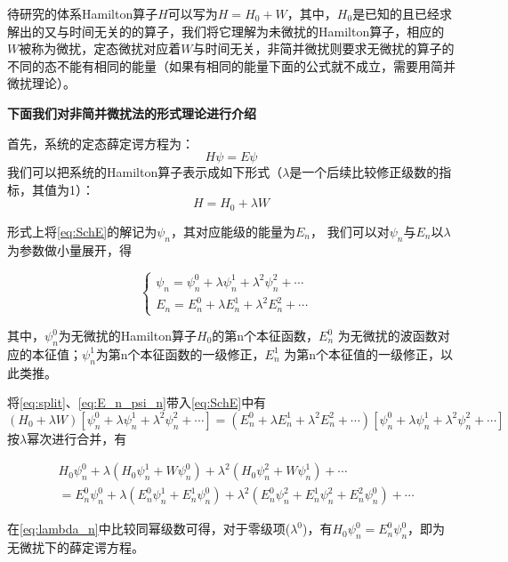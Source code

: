 待研究的体系Hamilton算子$H$可以写为$H=H_0+W$，其中，$H_0$是已知的且已经求解出的又与时间无关的的算子，我们将它理解为未微扰的Hamilton算子，相应的$W$被称为微扰，定态微扰对应着$W$与时间无关，非简并微扰则要求无微扰的算子的不同的态不能有相同的能量（如果有相同的能量下面的公式就不成立，需要用简并微扰理论）。

\textbf{下面我们对非简并微扰法的形式理论进行介绍}

首先，系统的定态薛定谔方程为：
\begin{equation}
	H\psi = E\psi
	\label{eq:SchE}
\end{equation}
我们可以把系统的Hamilton算子表示成如下形式（$\lambda$是一个后续比较修正级数的指标，其值为1）：
\begin{equation}
	H = H_0 +\lambda W
	\label{eq:split}
\end{equation}

形式上将\cref{eq:SchE}的解记为$\psi_n$，其对应能级的能量为$E_n$，
我们可以对$\psi_n$与$E_n$以$\lambda$为参数做小量展开，得

\begin{equation}
	\left\{\begin{matrix}
		\psi_n = \psi_n^0 +\lambda \psi_n^1 +\lambda^2 \psi_n^2 +\cdots & \\
		E_n = E_n^0 +\lambda E_n^1 +\lambda^2 E_n^2 +\cdots  
	\end{matrix}\right.
	\label{eq:E_n_psi_n}
\end{equation}

其中，$\psi _n^0$为无微扰的Hamilton算子$H_0$的第n个本征函数，$E_n^0$ 为无微扰的波函数对应的本征值；$\psi _n^1$为第n个本征函数的一级修正，$E_n^1$ 为第n个本征值的一级修正，以此类推。

将\cref{eq:split}、\cref{eq:E_n_psi_n}带入\cref{eq:SchE}中有
$$
(H_0 + \lambda W)
[ \psi_n^0 +\lambda \psi_n^1 +\lambda^2 \psi_n^2 +\cdots ]
=
( E_n^0 +\lambda E_n^1 +\lambda^2 E_n^2 +\cdots )
[\psi_n^0 +\lambda \psi_n^1 +\lambda^2 \psi_n^2 +\cdots]
$$
按$\lambda$幂次进行合并，有

\begin{align}
	& H_0 \psi_n^0 
	+\lambda (H_0 \psi_n^1 + W \psi_n^0)
	+ \lambda^2 (H_0 \psi_n^2 + W \psi_n^1) + \cdots \nonumber \\
	&= E_n^0 \psi_n^0 
	+ \lambda (E_n^0 \psi_n^1 + E_n^1 \psi_n^0)
	+ \lambda^2 (E_n^0 \psi_n^2 + E_n^1 \psi_n^2 + E_n^2 \psi_n^0) + \cdots
	\label{eq:lambda_n}
\end{align}

在\cref{eq:lambda_n}中比较同幂级数可得，对于零级项($\lambda ^0$)，有$H_0 \psi _n^0 =E_n^0 \psi_n^0$，即为无微扰下的薛定谔方程。

